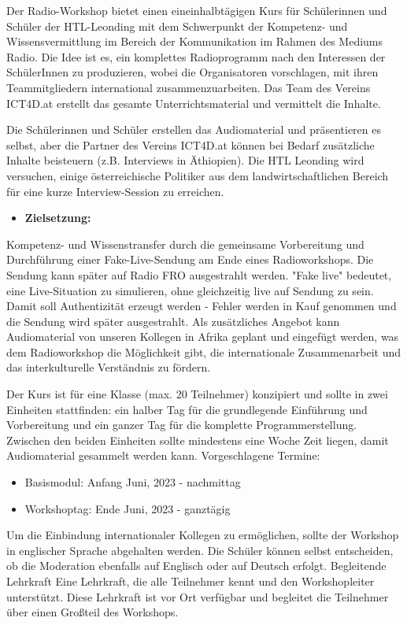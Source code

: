 Der Radio-Workshop bietet einen eineinhalbtägigen Kurs für Schülerinnen und Schüler der HTL-Leonding mit dem Schwerpunkt der Kompetenz- und Wissensvermittlung im Bereich der Kommunikation im Rahmen des Mediums Radio. Die Idee ist es, ein komplettes Radioprogramm nach den Interessen der SchülerInnen zu produzieren, wobei die Organisatoren vorschlagen, mit ihren Teammitgliedern international zusammenzuarbeiten. Das Team des Vereins ICT4D.at erstellt das gesamte Unterrichtsmaterial und vermittelt die Inhalte.

Die Schülerinnen und Schüler erstellen das Audiomaterial und präsentieren es selbst, aber die Partner des Vereins ICT4D.at können bei Bedarf zusätzliche Inhalte beisteuern (z.B. Interviews in Äthiopien). Die HTL Leonding wird versuchen, einige österreichische Politiker aus dem landwirtschaftlichen Bereich für eine kurze Interview-Session zu erreichen.

\begin{itemize}
    \item \textbf{Zielsetzung:}
\end{itemize}

Kompetenz- und Wissenstransfer durch die
gemeinsame Vorbereitung und Durchführung einer Fake-Live-Sendung am Ende eines Radioworkshops. Die Sendung kann später auf Radio FRO ausgestrahlt werden. "Fake live" bedeutet, eine Live-Situation zu simulieren, ohne gleichzeitig live auf Sendung zu sein. Damit soll Authentizität erzeugt werden - Fehler werden in Kauf genommen und die Sendung wird später ausgestrahlt. Als zusätzliches Angebot kann Audiomaterial von unseren Kollegen in Afrika geplant und eingefügt werden, was dem Radioworkshop die Möglichkeit gibt, die internationale Zusammenarbeit und das interkulturelle Verständnis zu fördern.

Der Kurs ist für eine Klasse (max. 20 Teilnehmer) konzipiert und sollte in zwei Einheiten stattfinden: ein halber Tag für die grundlegende Einführung und Vorbereitung und ein ganzer Tag für die komplette Programmerstellung. Zwischen den beiden Einheiten sollte mindestens eine Woche Zeit liegen, damit Audiomaterial gesammelt werden kann.
Vorgeschlagene Termine:

\begin{itemize}
    \item {Basismodul: Anfang Juni, 2023 - nachmittag}
    \item {Workshoptag: Ende Juni, 2023 - ganztägig}
\end{itemize}

Um die Einbindung internationaler Kollegen zu ermöglichen, sollte der Workshop in englischer Sprache abgehalten werden. Die Schüler können selbst entscheiden, ob die Moderation ebenfalls auf Englisch oder auf Deutsch erfolgt.
Begleitende Lehrkraft
Eine Lehrkraft, die alle Teilnehmer kennt und den Workshopleiter unterstützt. Diese Lehrkraft ist vor Ort verfügbar und begleitet die Teilnehmer über einen Großteil des Workshops.

